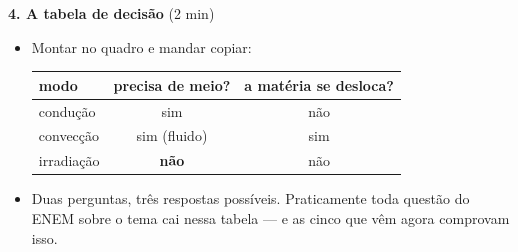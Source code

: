 \documentclass[11pt,a4paper]{article}
\begin{document}
\begin{quadro}
\medskip
\textbf{4. A tabela de decis\~ao} (2 min)
\begin{itemize}[nosep]
  \item Montar no quadro e mandar copiar:
  \begin{center}\small
    \begin{tabular}{@{}lcc@{}}
      \toprule
      modo & precisa de meio? & a mat\'eria se desloca? \\
      \midrule
      condu\c{c}\~ao   & sim              & n\~ao \\
      convec\c{c}\~ao  & sim (fluido)     & sim \\
      irradia\c{c}\~ao & \textbf{n\~ao}     & n\~ao \\
      \bottomrule
    \end{tabular}
  \end{center}
  \item Duas perguntas, tr\^es respostas poss\'iveis. Praticamente toda
        quest\~ao do ENEM sobre o tema cai nessa tabela --- e as cinco que
        v\^em agora comprovam isso.
\end{itemize}
\end{quadro}
\end{document}
